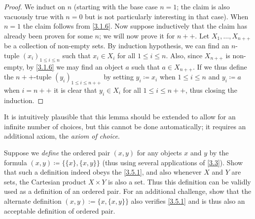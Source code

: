 \begin{proof}
  We induct on \(n\) (starting with the base case \(n = 1\); the claim is also vacuously true with \(n = 0\) but is not particularly interesting in that case).
  When \(n = 1\) the claim follows from \cref{3.1.6}.
  Now suppose inductively that the claim has already been proven for some \(n\);
  we will now prove it for \(n++\).
  Let \(X_1, \dots, X_{n++}\) be a collection of non-empty sets.
  By induction hypothesis, we can find an \(n\)-tuple \((x_i)_{1 \leq i \leq n}\) such that \(x_i \in X_i\) for all \(1 \leq i \leq n\).
  Also, since \(X_{n++}\) is non-empty, by \cref{3.1.6} we may find an object \(a\) such that \(a \in X_{n++}\).
  If we thus define the \(n++\)-tuple \((y_i)_{1 \leq i \leq n++}\) by setting \(y_i \coloneqq x_i\) when \(1 \leq i \leq n\) and \(y_i \coloneqq a\) when \(i = n++\) it is clear that \(y_i \in X_i\) for all \(1 \leq i \leq n++\), thus closing the induction.
\end{proof}

\begin{rmk}\label{3.5.13}
  It is intuitively plausible that this lemma should be extended to allow for an infinite number of choices, but this cannot be done automatically;
  it requires an additional axiom, the \emph{axiom of choice}.
\end{rmk}

\exercisesection

\begin{ex}\label{ex:3.5.1}
  Suppose we \emph{define} the ordered pair \((x, y)\) for any objects \(x\) and \(y\) by the formula \((x, y) \coloneqq \{\{x\}, \{x, y\}\}\)
  (thus using several applications of \cref{3.3}).
  Show that such a definition indeed obeys the \cref{3.5.1}, and also whenever \(X\) and \(Y\) are sets, the Cartesian product \(X \times Y\) is also a set.
  Thus this definition can be validly used as a definition of an ordered pair.
  For an additional challenge, show that the alternate definition \((x, y) := \{x, \{x, y\}\}\) also verifies \cref{3.5.1} and is thus also an acceptable definition of ordered pair.
\end{ex}

